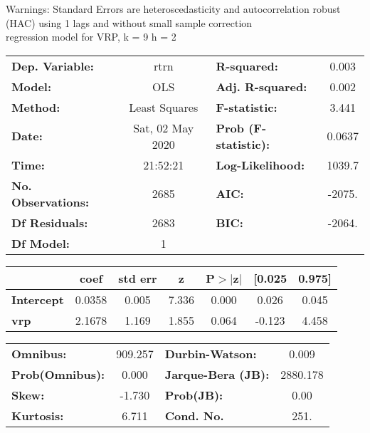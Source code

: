 Warnings: \newline
 [1] Standard Errors are heteroscedasticity and autocorrelation robust (HAC) using 1 lags and without small sample correction\\ 

regression model for VRP, k = 9 h = 2\begin{center}
\begin{tabular}{lclc}
\toprule
\textbf{Dep. Variable:}    &       rtrn       & \textbf{  R-squared:         } &     0.003   \\
\textbf{Model:}            &       OLS        & \textbf{  Adj. R-squared:    } &     0.002   \\
\textbf{Method:}           &  Least Squares   & \textbf{  F-statistic:       } &     3.441   \\
\textbf{Date:}             & Sat, 02 May 2020 & \textbf{  Prob (F-statistic):} &   0.0637    \\
\textbf{Time:}             &     21:52:21     & \textbf{  Log-Likelihood:    } &    1039.7   \\
\textbf{No. Observations:} &        2685      & \textbf{  AIC:               } &    -2075.   \\
\textbf{Df Residuals:}     &        2683      & \textbf{  BIC:               } &    -2064.   \\
\textbf{Df Model:}         &           1      & \textbf{                     } &             \\
\bottomrule
\end{tabular}
\begin{tabular}{lcccccc}
                   & \textbf{coef} & \textbf{std err} & \textbf{z} & \textbf{P$> |$z$|$} & \textbf{[0.025} & \textbf{0.975]}  \\
\midrule
\textbf{Intercept} &       0.0358  &        0.005     &     7.336  &         0.000        &        0.026    &        0.045     \\
\textbf{vrp}       &       2.1678  &        1.169     &     1.855  &         0.064        &       -0.123    &        4.458     \\
\bottomrule
\end{tabular}
\begin{tabular}{lclc}
\textbf{Omnibus:}       & 909.257 & \textbf{  Durbin-Watson:     } &    0.009  \\
\textbf{Prob(Omnibus):} &   0.000 & \textbf{  Jarque-Bera (JB):  } & 2880.178  \\
\textbf{Skew:}          &  -1.730 & \textbf{  Prob(JB):          } &     0.00  \\
\textbf{Kurtosis:}      &   6.711 & \textbf{  Cond. No.          } &     251.  \\
\bottomrule
\end{tabular}
\end{center}

